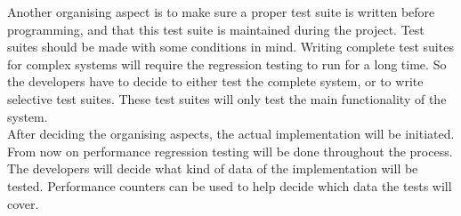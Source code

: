 Another organising aspect is to make sure a proper test suite is written before programming, and that this test suite is maintained during the project. Test suites should be made with some conditions in mind. Writing complete test suites for complex systems will require the regression testing to run for a long time. \cite{rothermel2001prioritizing} So the developers have to decide to either test the complete system, or to write selective test suites. These test suites will only test the main functionality of the system. \\
After deciding the organising aspects, the actual implementation will be initiated. From now on performance regression testing will be done throughout the process. The developers will decide what kind of data of the implementation will be tested. Performance counters can be used to help decide which data the tests will cover.

